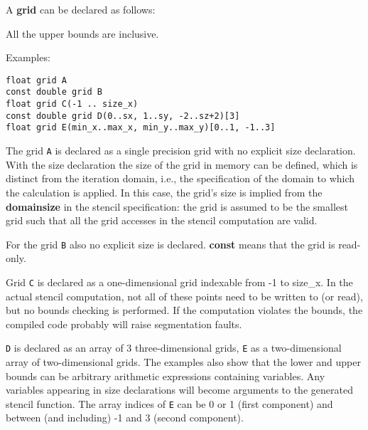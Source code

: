 \bigskip

\noindent A \textbf{grid} can be declared as follows:

\noindent All the upper bounds are inclusive.

\medskip
\noindent Examples:
\begin{lstlisting}[language=stencil]
float grid A
const double grid B
float grid C(-1 .. size_x)
const double grid D(0..sx, 1..sy, -2..sz+2)[3]
float grid E(min_x..max_x, min_y..max_y)[0..1, -1..3]
\end{lstlisting}

The grid \texttt{A} is declared as a single precision grid with no explicit size declaration.
With the size declaration the size of the grid in memory can be defined, which is distinct from the
iteration domain, i.e., the specification of the domain to which the calculation is applied.
In this case, the grid's size is implied from the \textbf{domainsize} in the stencil specification:
the grid is assumed to be the smallest grid such that all the grid accesses in the stencil computation are valid.

For the grid \texttt{B} also no explicit size is declared. \textbf{const} means that the grid is read-only.

Grid \texttt{C} is declared as a one-dimensional grid indexable from -1 to size\_x.
In the actual stencil computation, not all of these points need to be written to (or read), but
no bounds checking is performed. If the computation violates the bounds, the compiled code probably will raise
segmentation faults.

\texttt{D} is declared as an array of 3 three-dimensional grids,
\texttt{E} as a two-di\-men\-sional array of two-dimensional grids.
The examples also show that the lower and upper bounds can be arbitrary arithmetic expressions containing variables.
Any variables appearing in size declarations will become arguments to the generated stencil function.
The array indices of \texttt{E} can be 0 or 1 (first component) and between (and including) -1 and 3 (second component).

